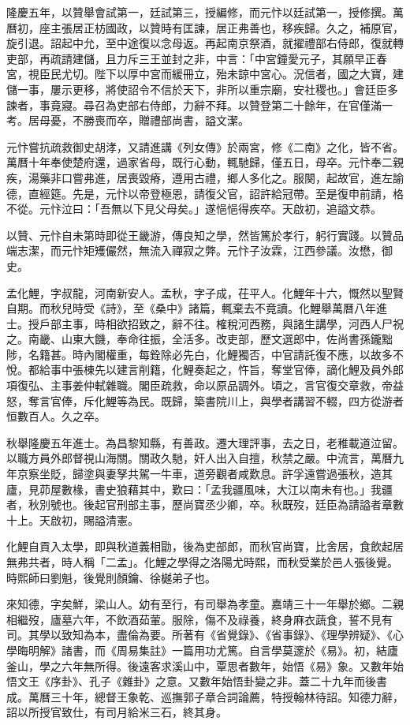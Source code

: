 \begin{pinyinscope}
隆慶五年，以贊舉會試第一，廷試第三，授編修，而元忭以廷試第一，授修撰。萬曆初，座主張居正枋國政，以贊時有匡諫，居正弗善也，移疾歸。久之，補原官，旋引退。詔起中允，至中途復以念母返。再起南京祭酒，就擢禮部右侍郎，復就轉吏部，再疏請建儲，且力斥三王並封之非，中言：「中宮鐘愛元子，其願早正春宮，視臣民尤切。陛下以厚中宮而緩冊立，殆未諒中宮心。況信者，國之大寶，建儲一事，屢示更移，將使詔令不信於天下，非所以重宗廟，安社稷也。」會廷臣多諫者，事竟寢。尋召為吏部右侍郎，力辭不拜。以贊登第二十餘年，在官僅滿一考。居母憂，不勝喪而卒，贈禮部尚書，謚文潔。

元忭嘗抗疏救御史胡涍，又請進講《列女傳》於兩宮，修《二南》之化，皆不省。萬曆十年奉使楚府還，過家省母，既行心動，輒馳歸，僅五日，母卒。元忭奉二親疾，湯藥非口嘗弗進，居喪毀瘠，遵用古禮，鄉人多化之。服闋，起故官，進左諭德，直經筵。先是，元忭以帝登極恩，請復父官，詔許給冠帶。至是復申前請，格不從。元忭泣曰：「吾無以下見父母矣。」遂悒悒得疾卒。天啟初，追謚文恭。

以贊、元忭自未第時即從王畿游，傳良知之學，然皆篤於孝行，躬行實踐。以贊品端志潔，而元忭矩矱儼然，無流入禪寂之弊。元忭子汝霖，江西參議。汝懋，御史。

孟化鯉，字叔龍，河南新安人。孟秋，字子成，茌平人。化鯉年十六，慨然以聖賢自期。而秋兒時受《詩》，至《桑中》諸篇，輒棄去不竟讀。化鯉舉萬曆八年進士。授戶部主事，時相欲招致之，辭不往。榷稅河西務，與諸生講學，河西人尸祝之。南畿、山東大饑，奉命往振，全活多。改吏部，歷文選郎中，佐尚書孫鑨黜陟，名籍甚。時內閣權重，每銓除必先白，化鯉獨否，中官請託復不應，以故多不悅。都給事中張棟先以建言削籍，化鯉奏起之，忤旨，奪堂官俸，謫化鯉及員外郎項復弘、主事姜仲軾雜職。閣臣疏救，命以原品調外。頃之，言官復交章救，帝益怒，奪言官俸，斥化鯉等為民。既歸，築書院川上，與學者講習不輟，四方從游者恒數百人。久之卒。

秋舉隆慶五年進士。為昌黎知縣，有善政。遷大理評事，去之日，老稚載道泣留。以職方員外郎督視山海關。關政久馳，奸人出入自擅，秋禁之嚴。中流言，萬曆九年京察坐貶，歸塗與妻孥共駕一牛車，道旁觀者咸歎息。許孚遠嘗過張秋，造其廬，見茆屋數椽，書史狼藉其中，歎曰：「孟我疆風味，大江以南未有也。」我疆者，秋別號也。後起官刑部主事，歷尚寶丞少卿，卒。秋既歿，廷臣為請謚者章數十上。天啟初，賜謚清憲。

化鯉自貢入太學，即與秋道義相勖，後為吏部郎，而秋官尚寶，比舍居，食飲起居無弗共者，時人稱「二孟」。化鯉之學得之洛陽尤時熙，而秋受業於邑人張後覺。時熙師曰劉魁，後覺則顏鑰、徐樾弟子也。

來知德，字矣鮮，梁山人。幼有至行，有司舉為孝童。嘉靖三十一年舉於鄉。二親相繼歿，廬墓六年，不飲酒茹葷。服除，傷不及祿養，終身麻衣蔬食，誓不見有司。其學以致知為本，盡倫為要。所著有《省覺錄》、《省事錄》、《理學辨疑》、《心學晦明解》諸書，而《周易集註》一篇用功尤篤。自言學莫邃於《易》。初，結廬釜山，學之六年無所得。後遠客求溪山中，覃思者數年，始悟《易》象。又數年始悟文王《序卦》、孔子《雜卦》之意。又數年始悟卦變之非。蓋二十九年而後書成。萬曆三十年，總督王象乾、巡撫郭子章合詞論薦，特授翰林待詔。知德力辭，詔以所授官致仕，有司月給米三石，終其身。


\end{pinyinscope}

